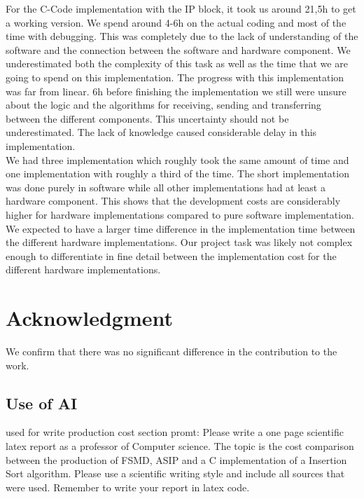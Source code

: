 \documentclass[conference]{IEEEtran}
\begin{document}
For the C-Code implementation with the IP block, it took us around 21,5h to get a working version. We spend around 4-6h on the actual coding and most of the time with debugging. This was completely due to the lack of understanding of the software and the connection between the software and hardware component. We underestimated both the complexity of this task as well as the time that we are going to spend on this implementation. The progress with this implementation was far from linear. 6h before finishing the implementation we still were unsure about the logic and the algorithms for receiving, sending and transferring between the different components. This uncertainty should not be underestimated. The lack of knowledge caused considerable delay in this implementation. \\
We had three implementation which roughly took the same amount of time and one implementation with roughly a third of the time. The short implementation was done purely in software while all other implementations had at least a hardware component. This shows that the development costs are considerably higher for hardware implementations compared to pure software implementation. We expected to have a larger time difference in the implementation time between the different hardware implementations. Our project task was likely not complex enough to differentiate in fine detail between the implementation cost for the different hardware implementations.

\section*{Acknowledgment}

We confirm that there was no significant difference in the contribution to the work.

\printbibliography

\begin{appendices}
\section{Use of AI}
used for write production cost section promt: Please write a one page scientific latex report as a professor of Computer science. The topic is the cost comparison between the production of FSMD, ASIP and a C implementation of a Insertion Sort algorithm. Please use a scientific writing style and include all sources that were used. Remember to write your report in latex code.
\end{appendices}
\end{document}
